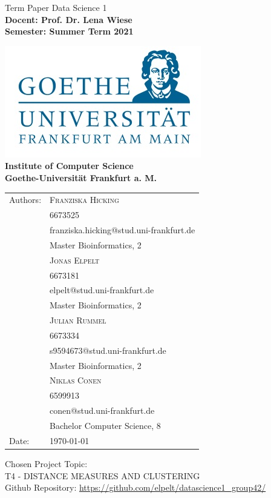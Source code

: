 \documentclass[12pt, english]
{article}
\begin{document}
\begin{titlepage}

\begin{center}

{\Huge {
Term Paper Data Science 1}
}
\\[2ex]

\textbf{
\Large 
Docent: Prof. Dr. Lena Wiese \\ 
Semester: Summer Term 2021\\  
}



\includegraphics[scale=0.4]{logo.jpg} \\ 
\large{\textbf{Institute of Computer Science \\ Goethe-Universit\"at Frankfurt a. M.}}



\begin{tabular}{ll}
Authors: & \textsc{Franziska Hicking} \\
& {\small 6673525} \\
& {\small franziska.hicking@stud.uni-frankfurt.de} \\
& {\small Master Bioinformatics, 2} \\
& \textsc{Jonas Elpelt} \\
& {\small 6673181}\\
&{\small  elpelt@stud.uni-frankfurt.de}\\
& {\small Master Bioinformatics, 2} \\
& \textsc{Julian Rummel} \\
&{\small  6673334}\\
& {\small s9594673@stud.uni-frankfurt.de}\\
&{\small  Master Bioinformatics, 2} \\
& \textsc{Niklas Conen}\\
& {\small 6599913}\\
& {\small conen@stud.uni-frankfurt.de}\\
& {\small Bachelor Computer Science, 8}\\
Date: & \today \\		
\end{tabular}

\end{center}

\vspace*{\fill}

\large
\noindent{}Chosen Project Topic: \\
T4 - DISTANCE MEASURES AND CLUSTERING \\
\small Github Repository: \url{https://github.com/elpelt/datascience1\_group42/}




\end{titlepage}
\end{document}
